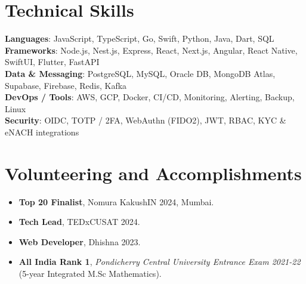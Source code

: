 \documentclass[letterpaper,11pt]{article}
\begin{document}
\section{Technical Skills}
 \begin{itemize}[leftmargin=0.15in, label={}]
    \small{\item{
     \textbf{Languages}{: JavaScript, TypeScript, Go, Swift, Python, Java, Dart, SQL} \\
     \textbf{Frameworks}{: Node.js, Nest.js, Express, React, Next.js, Angular, React Native, SwiftUI, Flutter, FastAPI} \\
     \textbf{Data \& Messaging}{: PostgreSQL, MySQL, Oracle DB, MongoDB Atlas, Supabase, Firebase, Redis, Kafka} \\
     \textbf{DevOps / Tools}{: AWS, GCP, Docker, CI/CD, Monitoring, Alerting, Backup, Linux} \\
     \textbf{Security}{: OIDC, TOTP / 2FA, WebAuthn (FIDO2), JWT, RBAC, KYC \& eNACH integrations}
    }}
 \end{itemize}
\vspace{-6pt}

\section{Volunteering and Accomplishments}
  \begin{itemize}[leftmargin=0.15in]
    \setlength\itemsep{-0.2em}
    \item\small\textbf{Top 20 Finalist}, Nomura KakushIN 2024, Mumbai.
    \item\small\textbf{Tech Lead}, TEDxCUSAT 2024.
    \item\small\textbf{Web Developer}, Dhishna 2023.
    \item\small\textbf{All India Rank 1}, \textit{Pondicherry Central University Entrance Exam 2021-22} (5-year Integrated M.Sc Mathematics).
  \end{itemize}
\end{document}
